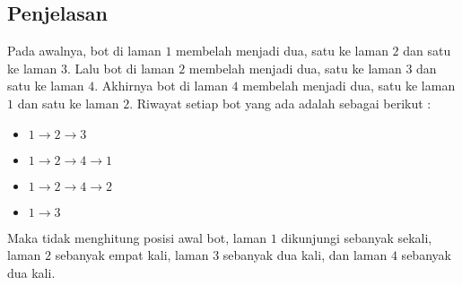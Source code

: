\documentclass{article}
\begin{document}
\subsection*{Penjelasan}
Pada awalnya, bot di laman $1$ membelah menjadi dua, satu ke laman $2$ dan satu ke laman $3$. Lalu bot di laman $2$ membelah menjadi dua, satu ke laman $3$ dan satu ke laman $4$. Akhirnya bot di laman $4$ membelah menjadi dua, satu ke laman $1$ dan satu ke laman $2$.
Riwayat setiap  bot yang ada adalah sebagai berikut :
\begin{itemize}
    \setlength\itemsep{0pt}
    \item $1 \rightarrow 2 \rightarrow 3$
    \item $1 \rightarrow 2 \rightarrow 4 \rightarrow 1$
    \item $1 \rightarrow 2 \rightarrow 4 \rightarrow 2$
    \item $1 \rightarrow 3$
\end{itemize}
Maka tidak menghitung posisi awal bot, laman $1$ dikunjungi sebanyak sekali, laman $2$ sebanyak empat kali, laman $3$ sebanyak dua kali, dan laman $4$ sebanyak dua kali.

\pagebreak
\end{document}
